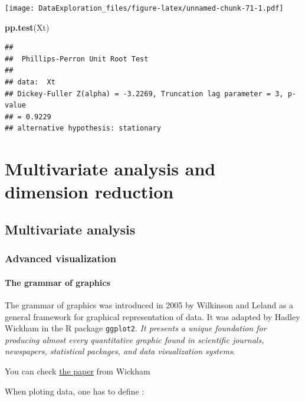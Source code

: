 \documentclass[
]{book}
\newenvironment{Shaded}{\begin{snugshade}}{\end{snugshade}}
\newcommand{\KeywordTok}[1]{\textcolor[rgb]{0.13,0.29,0.53}{\textbf{#1}}}
\newcommand{\NormalTok}[1]{#1}
\begin{document}
\texttt{[image: DataExploration\_files/figure-latex/unnamed-chunk-71-1.pdf]}

\begin{Shaded}
\begin{Highlighting}[]
\KeywordTok{pp.test}\NormalTok{(Xt)}
\end{Highlighting}
\end{Shaded}

\begin{verbatim}
## 
## 	Phillips-Perron Unit Root Test
## 
## data:  Xt
## Dickey-Fuller Z(alpha) = -3.2269, Truncation lag parameter = 3, p-value
## = 0.9229
## alternative hypothesis: stationary
\end{verbatim}

\hypertarget{multivar}{%
\chapter{Multivariate analysis and dimension reduction}\label{multivar}}

\hypertarget{multivariate-analysis}{%
\section{Multivariate analysis}\label{multivariate-analysis}}

\hypertarget{advanced-visualization}{%
\subsection{Advanced visualization}\label{advanced-visualization}}

\hypertarget{the-grammar-of-graphics}{%
\subsubsection{The grammar of graphics}\label{the-grammar-of-graphics}}

The grammar of graphics was introduced in 2005 by Wilkinson and Leland as a general framework for graphical representation of data. It was adapted by Hadley Wickham in the R package \texttt{ggplot2}.
\emph{It presents a unique foundation for producing almost every quantitative graphic found in scientific journals, newspapers, statistical packages, and data visualization systems}.

You can check \href{https://vita.had.co.nz/papers/layered-grammar.html}{the paper} from Wickham

When ploting data, one has to define :
\end{document}
